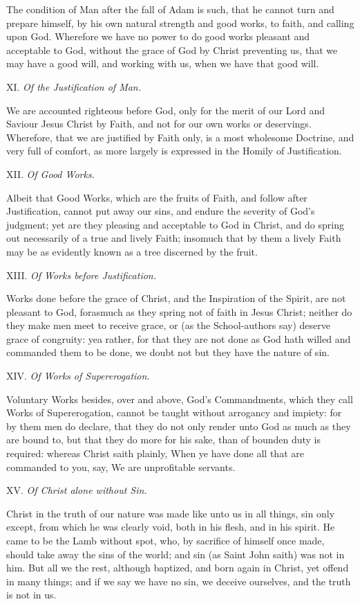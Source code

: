 The condition of Man after the fall of Adam is such, that he cannot turn
and prepare himself, by his own natural strength and good works, to faith,
and calling upon God. Wherefore we have no power to do good works pleasant
and acceptable to God, without the grace of God by Christ preventing us,
that we may have a good will, and working with us, when we have that good
will.

XI. \emph{Of the Justification of Man.}

We are accounted righteous before God, only for the merit of our Lord
and Saviour Jesus Christ by Faith, and not for our own works or deservings.
Wherefore, that we are justified by Faith only, is a most wholesome Doctrine,
and very full of comfort, as more largely is expressed in the Homily of
Justification.

XII. \emph{Of Good Works.}

Albeit that Good Works, which are the fruits of Faith, and follow after
Justification, cannot put away our sins, and endure the severity of God's
judgment; yet are they pleasing and acceptable to God in Christ, and do
spring out necessarily of a true and lively Faith; insomuch that by them
a lively Faith may be as evidently known as a tree discerned by the fruit.

XIII. \emph{Of Works before Justification.}

Works done before the grace of Christ, and the Inspiration of the Spirit,
are not pleasant to God, forasmuch as they spring not of faith in Jesus
Christ; neither do they make men meet to receive grace, or (as the School-authors
say) deserve grace of congruity: yea rather, for that they are not done
as God hath willed and commanded them to be done, we doubt not but they
have the nature of sin.

XIV. \emph{Of Works of Supererogation.}

Voluntary Works besides, over and above, God's Commandments, which they
call Works of Supererogation, cannot be taught without arrogancy and impiety:
for by them men do declare, that they do not only render unto God as much
as they are bound to, but that they do more for his sake, than of bounden
duty is required: whereas Christ saith plainly, When ye have done all
that are commanded to you, say, We are unprofitable servants.

XV. \emph{Of Christ alone without Sin.}

Christ in the truth of our nature was made like unto us in all things,
sin only except, from which he was clearly void, both in his flesh, and
in his spirit. He came to be the Lamb without spot, who, by sacrifice
of himself once made, should take away the sins of the world; and sin
(as Saint John saith) was not in him. But all we the rest, although baptized,
and born again in Christ, yet offend in many things; and if we say we
have no sin, we deceive ourselves, and the truth is not in us.


